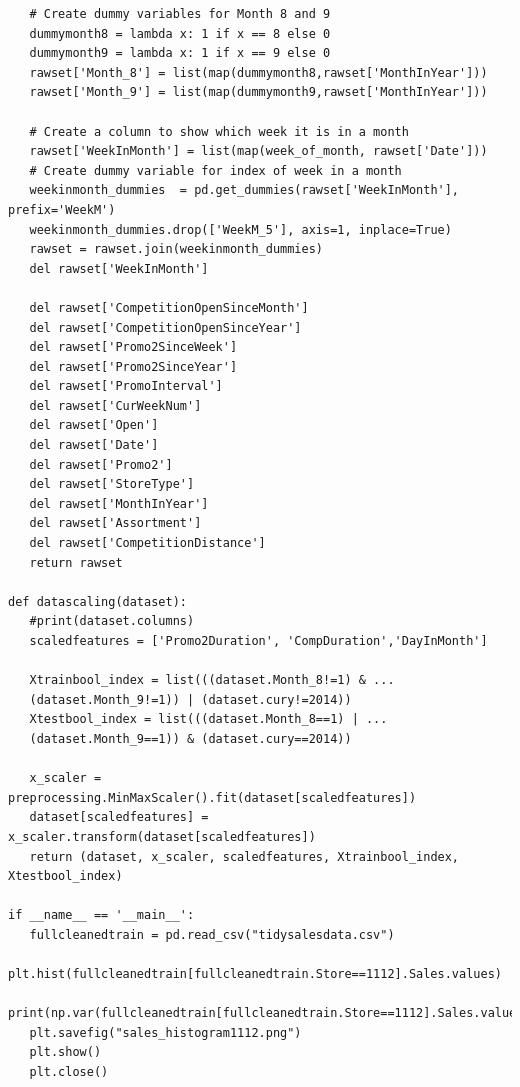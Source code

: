 \documentclass[11pt]{article}
\begin{document}
\begin{verbatim}
   # Create dummy variables for Month 8 and 9
   dummymonth8 = lambda x: 1 if x == 8 else 0
   dummymonth9 = lambda x: 1 if x == 9 else 0
   rawset['Month_8'] = list(map(dummymonth8,rawset['MonthInYear']))
   rawset['Month_9'] = list(map(dummymonth9,rawset['MonthInYear']))
   
   # Create a column to show which week it is in a month
   rawset['WeekInMonth'] = list(map(week_of_month, rawset['Date']))
   # Create dummy variable for index of week in a month
   weekinmonth_dummies  = pd.get_dummies(rawset['WeekInMonth'], prefix='WeekM')
   weekinmonth_dummies.drop(['WeekM_5'], axis=1, inplace=True)
   rawset = rawset.join(weekinmonth_dummies)
   del rawset['WeekInMonth']
   
   del rawset['CompetitionOpenSinceMonth']
   del rawset['CompetitionOpenSinceYear']
   del rawset['Promo2SinceWeek']
   del rawset['Promo2SinceYear']
   del rawset['PromoInterval']
   del rawset['CurWeekNum']
   del rawset['Open']
   del rawset['Date']
   del rawset['Promo2']
   del rawset['StoreType']
   del rawset['MonthInYear']
   del rawset['Assortment']
   del rawset['CompetitionDistance']
   return rawset

def datascaling(dataset):
   #print(dataset.columns)
   scaledfeatures = ['Promo2Duration', 'CompDuration','DayInMonth']

   Xtrainbool_index = list(((dataset.Month_8!=1) & ...
   (dataset.Month_9!=1)) | (dataset.cury!=2014))
   Xtestbool_index = list(((dataset.Month_8==1) | ...
   (dataset.Month_9==1)) & (dataset.cury==2014))

   x_scaler = preprocessing.MinMaxScaler().fit(dataset[scaledfeatures])
   dataset[scaledfeatures] = x_scaler.transform(dataset[scaledfeatures])
   return (dataset, x_scaler, scaledfeatures, Xtrainbool_index, Xtestbool_index)

if __name__ == '__main__':
   fullcleanedtrain = pd.read_csv("tidysalesdata.csv")
   plt.hist(fullcleanedtrain[fullcleanedtrain.Store==1112].Sales.values)
   print(np.var(fullcleanedtrain[fullcleanedtrain.Store==1112].Sales.values))
   plt.savefig("sales_histogram1112.png")
   plt.show()
   plt.close()
\end{verbatim}
\end{document}
